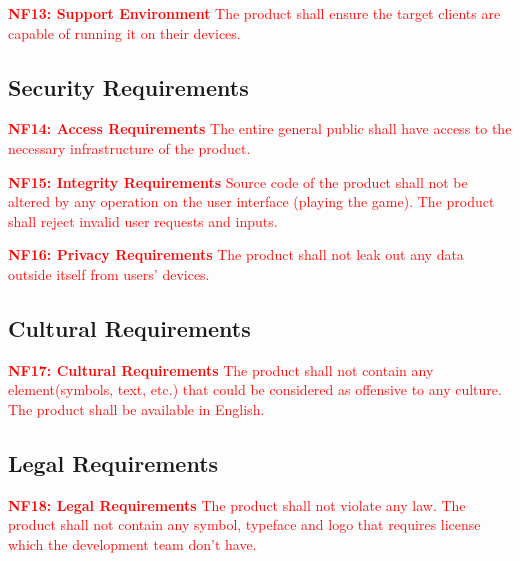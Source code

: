 \documentclass[12pt, titlepage]{article}
\begin{document}
\noindent \textcolor{red}{\textbf{NF13: Support Environment}
\newline
The product shall ensure the target clients are capable of running it on their devices.}

\subsection{Security Requirements}

\noindent \textcolor{red}{\textbf{NF14: Access Requirements}
\newline
The entire general public shall have access to the necessary infrastructure of the product.}
\newline

\noindent \textcolor{red}{\textbf{NF15: Integrity Requirements}
\newline
Source code of the product shall not be altered by any operation on the user interface (playing the game).\newline
The product shall reject invalid user requests and inputs.}
\newline

\noindent \textcolor{red}{\textbf{NF16: Privacy Requirements}
\newline
The product shall not leak out any data outside itself from users' devices.}

\subsection{Cultural Requirements}

\noindent \textcolor{red}{\textbf{NF17: Cultural Requirements}
\newline
The product shall not contain any element(symbols, text, etc.) that could be considered as offensive to any culture.\newline
The product shall be available in English.}

\subsection{Legal Requirements}

\noindent \textcolor{red}{\textbf{NF18: Legal Requirements}
\newline
The product shall not violate any law.\newline
The product shall not contain any symbol, typeface and logo that requires license which the development team don't have. }
\end{document}
